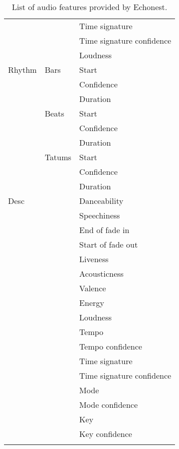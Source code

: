 \begin{center}
\begin{longtable}{ p{} p{} p{} }
& & Time signature \\ \cmidrule(r){3-3}
& & Time signature confidence \\ \cmidrule(r){3-3}
& & Loudness \\ \hline
Rhythm & Bars & Start \\ \cmidrule(r){3-3}
& & Confidence \\ \cmidrule(r){3-3}
& & Duration \\ \cmidrule(r){2-3}
& Beats & Start \\ \cmidrule(r){3-3}
& & Confidence \\ \cmidrule(r){3-3}
& & Duration \\ \cmidrule(r){2-3}
& Tatums & Start \\ \cmidrule(r){3-3}
& & Confidence \\ \cmidrule(r){3-3}
& & Duration \\ \hline
Desc & & Danceability \\ \cmidrule(r){3-3}
& & Speechiness \\ \cmidrule(r){3-3}
& & End of fade in \\ \cmidrule(r){3-3}
& & Start of fade out \\ \cmidrule(r){3-3}
& & Liveness \\ \cmidrule(r){3-3}
& & Acousticness \\ \cmidrule(r){3-3}
& & Valence \\ \cmidrule(r){3-3}
& & Energy \\ \cmidrule(r){3-3}
& & Loudness \\ \cmidrule(r){3-3}
& & Tempo \\ \cmidrule(r){3-3}
& & Tempo confidence \\ \cmidrule(r){3-3}
& & Time signature \\ \cmidrule(r){3-3}
& & Time signature confidence \\ \cmidrule(r){3-3}
& & Mode \\ \cmidrule(r){3-3}
& & Mode confidence \\ \cmidrule(r){3-3}
& & Key \\ \cmidrule(r){3-3}
& & Key confidence \\ \bottomrule



\caption[List of audio features provided by Echonest]{List of audio features provided by Echonest.}
\label{table:echonestFeatures}
\end{longtable}
\end{center}